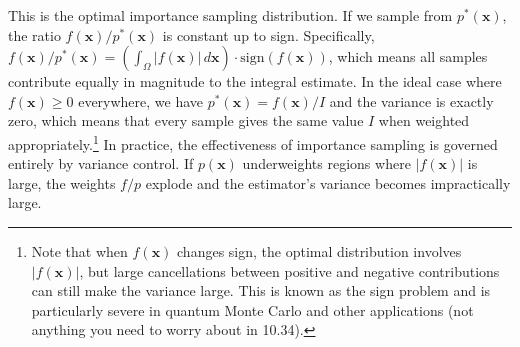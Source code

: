 This is the optimal importance sampling distribution. If we sample from $p^*(\mathbf{x})$, the ratio $f(\mathbf{x})/p^*(\mathbf{x})$ is constant up to sign. Specifically, $f(\mathbf{x})/p^*(\mathbf{x}) = \left(\int_\Omega |f(\mathbf{x})| \, d\mathbf{x}\right) \cdot \text{sign}(f(\mathbf{x}))$, which means all samples contribute equally in magnitude to the integral estimate. In the ideal case where $f(\mathbf{x}) \geq 0$ everywhere, we have $p^*(\mathbf{x}) = f(\mathbf{x})/I$ and the variance is exactly zero, which means that every sample gives the same value $I$ when weighted appropriately.\footnote{Note that when $f(\mathbf{x})$ changes sign, the optimal distribution involves $|f(\mathbf{x})|$, but large cancellations between positive and negative contributions can still make the variance large. This is known as the sign problem and is particularly severe in quantum Monte Carlo and other applications (not anything you need to worry about in 10.34).} In practice, the effectiveness of importance sampling is governed entirely by variance control. If $p(\mathbf{x})$ underweights regions where $|f(\mathbf{x})|$ is large, the weights $f/p$ explode and the estimator's variance becomes impractically large.

